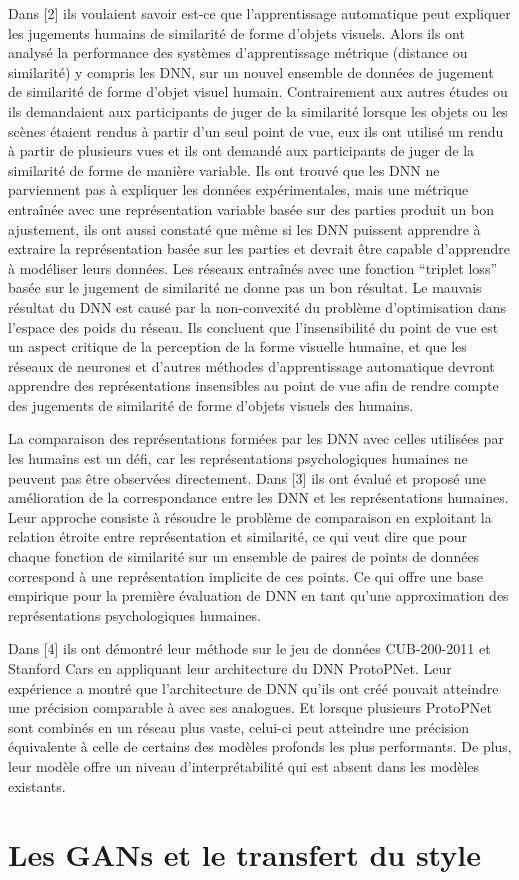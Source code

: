 Dans [2] ils voulaient savoir est-ce que l’apprentissage automatique peut expliquer les jugements humains de similarité de forme d’objets visuels. Alors ils ont analysé la performance des systèmes d’apprentissage métrique (distance ou similarité) y compris les DNN, sur un nouvel ensemble de données de jugement de similarité de forme d’objet visuel humain. Contrairement aux autres études ou ils demandaient aux participants de juger de la similarité lorsque les objets ou les scènes étaient rendus à partir d’un seul point de vue, eux ils ont utilisé un rendu à partir de plusieurs vues et ils ont demandé aux participants de juger de la similarité de forme de manière variable. Ils ont trouvé que les DNN ne parviennent pas à expliquer les données expérimentales, mais une métrique entraînée avec une représentation variable basée sur des parties produit un bon ajustement, ils ont aussi constaté que même si les DNN puissent apprendre à extraire la représentation basée sur les parties et devrait être capable d’apprendre à modéliser leurs données. Les réseaux entraînés avec une fonction “triplet loss” basée sur le jugement de similarité ne donne pas un bon résultat. Le mauvais résultat du DNN est causé par la non-convexité du problème d’optimisation dans l’espace des poids du réseau. Ils concluent que l’insensibilité du point de vue est un aspect critique de la perception de la forme visuelle humaine, et que les réseaux de neurones et d’autres méthodes d’apprentissage automatique devront apprendre des représentations insensibles au point de vue afin de rendre compte des jugements de similarité de forme d’objets visuels des humains.

La comparaison des représentations formées par les DNN avec celles utilisées par les humains est un défi, car les représentations psychologiques humaines ne peuvent pas être observées directement. Dans [3] ils ont évalué et proposé une amélioration de la correspondance entre les DNN et les représentations humaines. Leur approche consiste à résoudre le problème de comparaison en exploitant la relation étroite entre représentation et similarité, ce qui veut dire que pour chaque fonction de similarité sur un ensemble de paires de points de données correspond à une représentation implicite de ces points. Ce qui offre une base empirique pour la première évaluation de DNN en tant qu’une approximation des représentations psychologiques humaines.
  
Dans [4] ils ont démontré leur méthode sur le jeu de données CUB-200-2011 et Stanford Cars en appliquant leur architecture du DNN ProtoPNet. Leur expérience a montré que l’architecture de DNN qu’ils ont créé pouvait atteindre une précision comparable à avec ses analogues. Et lorsque plusieurs ProtoPNet sont combinés en un réseau plus vaste, celui-ci peut atteindre une précision équivalente à celle de certains des modèles profonds les plus performants. De plus, leur modèle offre un niveau d’interprétabilité qui est absent dans les modèles existants. 


\section{Les GANs et le transfert du style}